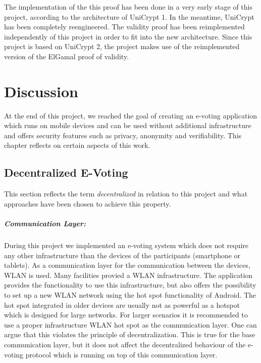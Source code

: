 \documentclass[numbers=noenddot, abstract=on, a4paper, headsepline,
footsepline, oneside, draft=off]{scrreprt}
\begin{document}
The implementation of the this proof has been done in a very early stage of this
project, according to the architecture of UniCrypt 1. In the meantime, UniCrypt
has been completely reengineered. The validity proof has been reimplemented
independently of this project in order to fit into the new architecture. Since
this project is based on UniCrypt 2, the project makes use of the reimplemented
version of the ElGamal proof of validity.


\chapter{Discussion}
\label{cha:discussion}
At the end of this project, we reached the goal of creating an e-voting
application which runs on mobile devices and can be used without additional
infrastructure and offers security features such as privacy, anonymity and
verifiability. This chapter reflects on certain aspects of this work.

\section{Decentralized E-Voting}
\label{sec:discussiondecentralizedevoting}
This section reflects the term \emph{decentralized} in relation to this project
and what approaches have been chosen to achieve this property.

\paragraph{Communication Layer:} During this project we implemented an e-voting
system which does not require any other infrastructure than the devices of the
participants (smartphone or tablets). As a communication layer for the
communication between the devices, WLAN is used. Many facilities provied a WLAN
infrastructure. The application provides the functionality to use this
infrastructure, but also offers the possibility to set up a new WLAN network
using the hot spot functionality of Android. The hot spot integrated in older
devices are usually not as powerful as a hotspot which is designed for large
networks. For larger scenarios it is recommended to use a proper infrastructure
WLAN hot spot as the communication layer. One can argue that this violates the
principle of decentralization. This is true for the base communication layer,
but it does not affect the decentralized behaviour of the e-voting protocol
which is running on top of this communication layer.
\end{document}
